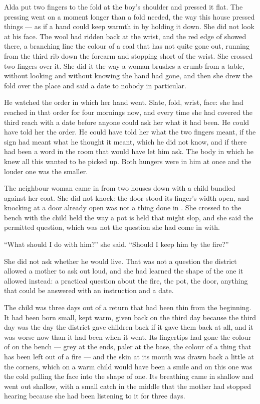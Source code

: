 Alda put two fingers to the fold at the boy's shoulder and pressed it flat. The pressing went on a moment longer than a fold needed, the way this house pressed things --- as if a hand could keep warmth in by holding it down. She did not look at his face. The wool had ridden back at the wrist, and the red edge of  showed there, a branching line the colour of a coal that has not quite gone out, running from the third rib down the forearm and stopping short of the wrist. She crossed two fingers over it. She did it the way a woman brushes a crumb from a table, without looking and without knowing the hand had gone, and then she drew the fold over the place and said a date to nobody in particular.

He watched the order in which her hand went. Slate, fold, wrist, face: she had reached in that order for four mornings now, and every time she had covered the third reach with a date before anyone could ask her what it had been. He could have told her the order. He could have told her what the two fingers meant, if the sign had meant what he thought it meant, which he did not know, and if there had been a word in the room that would have let him ask. The body in which he knew all this wanted to be picked up. Both hungers were in him at once and the louder one was the smaller.

\scenebreak

The neighbour woman came in from two houses down with a child bundled against her coat. She did not knock: the door stood its finger's width open, and knocking at a door already open was not a thing done in . She crossed to the bench with the child held the way a pot is held that might slop, and she said the permitted question, which was not the question she had come in with.

“What should I do with him?” she said. “Should I keep him by the fire?”

She did not ask whether he would live. That was not a question the district allowed a mother to ask out loud, and she had learned the shape of the one it allowed instead: a practical question about the fire, the pot, the door, anything that could be answered with an instruction and a date.

The child was three days out of a return that had been thin from the beginning. It had been born small, kept warm, given back on the third day because the third day was the day the district gave children back if it gave them back at all, and it was worse now than it had been when it went. Its fingertips had gone the colour of  on the bench --- grey at the ends, paler at the base, the colour of a thing that has been left out of a fire --- and the skin at its mouth was drawn back a little at the corners, which on a warm child would have been a smile and on this one was the cold pulling the face into the shape of one. Its breathing came in shallow and went out shallow, with a small catch in the middle that the mother had stopped hearing because she had been listening to it for three days.

